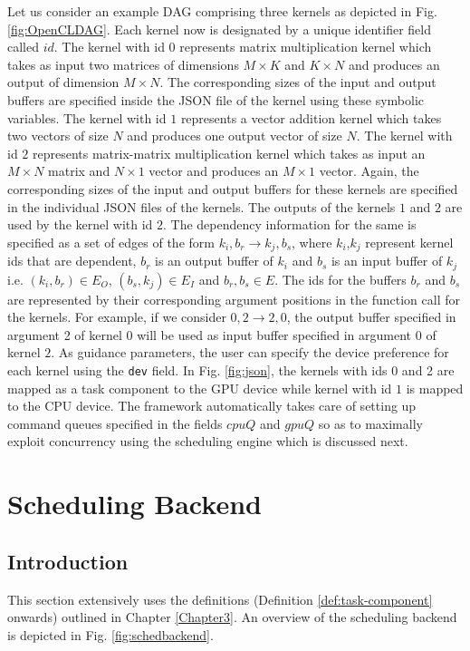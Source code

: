     \par Let us consider an example DAG comprising three kernels as depicted in Fig. \ref{fig:OpenCLDAG}. Each kernel now is designated by a unique identifier field called $id$. The kernel with id $0$ represents matrix multiplication kernel which takes as input two matrices of dimensions $M \times K$ and $K \times N$ and produces an output of dimension $M \times N$. The corresponding sizes of the input and output buffers are specified inside the JSON file of the kernel using these symbolic variables. The kernel with id $1$ represents a vector addition kernel which takes two vectors of size $N$ and produces one output vector of size $N$. The kernel with id $2$ represents  matrix-matrix multiplication kernel which takes as input an $M\times N$ matrix and $N\times 1$ vector and produces an $M \times 1$ vector. Again, the corresponding sizes of the input and output buffers for these kernels are specified in the individual JSON files of the kernels. The outputs of the kernels $1$ and $2$ are used by the kernel with id $2$. The dependency information for the same is specified as a set of edges of the form $k_i,b_r \rightarrow k_j,b_s$, where $k_i$,$k_j$ represent kernel ids that are dependent, $b_r$ is an output buffer of $k_i$ and $b_s$ is an input buffer of $k_j$ i.e. $(k_i,b_r) \in E_O$, $(b_s,k_j) \in E_I$ and $b_r,b_s \in E$. The ids for the buffers $b_r$ and $b_s$ are represented by their corresponding argument positions in the function call for the kernels. For example, if we consider $0,2 \rightarrow 2, 0$, the output buffer specified in argument 2 of kernel $0$ will be used as input buffer specified in argument 0 of kernel $2$. As guidance parameters, the user can specify the device preference for each kernel using the {\tt dev} field. In Fig. \ref{fig:json}, the kernels with ids 0 and 2 are mapped as a task component to the GPU device while kernel with id $1$ is mapped to the CPU device. The framework automatically takes care of setting up command queues specified in the fields $cpuQ$ and $gpuQ$ so as to maximally exploit concurrency using the scheduling engine which is discussed next.
    
	\section{Scheduling Backend}
	\subsection{Introduction}
	This section extensively uses the definitions (Definition \ref{def:task-component} onwards) outlined in Chapter \ref{Chapter3}. 
	An overview of the scheduling backend is depicted in Fig. \ref{fig:schedbackend}. 

